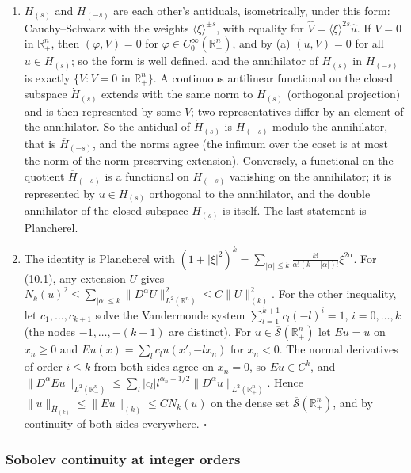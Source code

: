 \documentclass[
  11pt,
]{article}
\begin{document}
\begin{enumerate}
\def\labelenumi{(\alph{enumi})}
\setcounter{enumi}{1}
\item
  \(H_{(s)}\) and \(H_{(-s)}\) are each other's antiduals,
  isometrically, under this form: Cauchy--Schwarz with the weights
  \(\langle\xi\rangle^{\pm s}\), with equality for
  \(\widehat V=\langle\xi\rangle^{2s}\widehat u\). If \(V=0\) in
  \(\mathbb R^n_+\), then \((\varphi,V)=0\) for
  \(\varphi\in C_0^\infty(\mathbb R^n_+)\), and by (a) \((u,V)=0\) for
  all \(u\in\dot H_{(s)}\); so the form is well defined, and the
  annihilator of \(\dot H_{(s)}\) in \(H_{(-s)}\) is exactly
  \(\{V:V=0\text{ in }\mathbb R^n_+\}\). A continuous antilinear
  functional on the closed subspace \(\dot H_{(s)}\) extends with the
  same norm to \(H_{(s)}\) (orthogonal projection) and is then
  represented by some \(V\); two representatives differ by an element of
  the annihilator. So the antidual of \(\dot H_{(s)}\) is \(H_{(-s)}\)
  modulo the annihilator, that is \(\overline H_{(-s)}\), and the norms
  agree (the infimum over the coset is at most the norm of the
  norm-preserving extension). Conversely, a functional on the quotient
  \(\overline H_{(-s)}\) is a functional on \(H_{(-s)}\) vanishing on
  the annihilator; it is represented by \(u\in H_{(s)}\) orthogonal to
  the annihilator, and the double annihilator of the closed subspace
  \(\dot H_{(s)}\) is itself. The last statement is Plancherel.
\item
  The identity is Plancherel with
  \((1+|\xi|^2)^k=\sum_{|\alpha|\leq k}\frac{k!}{\alpha!(k-|\alpha|)!}\xi^{2\alpha}\).
  For (10.1), any extension \(U\) gives
  \(N_k(u)^2\leq\sum_{|\alpha|\leq k}\|D^\alpha U\|^2_{L^2(\mathbb R^n)}\leq C\|U\|^2_{(k)}\).
  For the other inequality, let \(c_1,\ldots,c_{k+1}\) solve the
  Vandermonde system \(\sum_{l=1}^{k+1}c_l(-l)^i=1\), \(i=0,\ldots,k\)
  (the nodes \(-1,\ldots,-(k+1)\) are distinct). For
  \(u\in\overline{\mathcal S}(\mathbb R^n_+)\) let \(Eu=u\) on
  \(x_n\geq0\) and \(Eu(x)=\sum_lc_lu(x',-lx_n)\) for \(x_n<0\). The
  normal derivatives of order \(i\leq k\) from both sides agree on
  \(x_n=0\), so \(Eu\in C^k\), and
  \(\|D^\alpha Eu\|_{L^2(\mathbb R^n_-)}\leq\sum_l|c_l|l^{\alpha_n-1/2}\|D^\alpha u\|_{L^2(\mathbb R^n_+)}\).
  Hence \(\|u\|_{\overline H_{(k)}}\leq\|Eu\|_{(k)}\leq CN_k(u)\) on the
  dense set \(\overline{\mathcal S}(\mathbb R^n_+)\), and by continuity
  of both sides everywhere. \(\square\)
\end{enumerate}

\subsubsection{Sobolev continuity at integer
orders}\label{sobolev-continuity-at-integer-orders}
\end{document}

